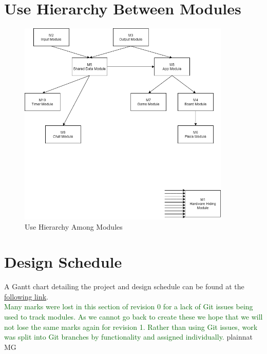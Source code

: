 \documentclass[12pt, titlepage]{article}
\begin{document}
\section{Use Hierarchy Between Modules} \label{SecUse}

\begin{figure}[H]
\centering
\includegraphics[width=0.9\textwidth]{ModuleHierarchyDiagram.png}
\caption{Use Hierarchy Among Modules}
\label{FigUH}
\end{figure}


\section{Design Schedule}
		
A Gantt chart detailing the project and design schedule can be found at the \href{https://gitlab.cas.mcmaster.ca/celsj/3xa3-group2-chess/-/blob/master/ProjectSchedule/3XA3_ProjectSchedule.pdf}{following link}. \\

\textcolor{darkgreen}{Many marks were lost in this section of revision 0 for a lack of Git issues being used to track modules. As we cannot go back to create these we hope that we will not lose the same marks again for revision 1. Rather than using Git issues, work was split into Git branches by functionality and assigned individually.}
 {plainnat}
 {MG}
\end{document}

